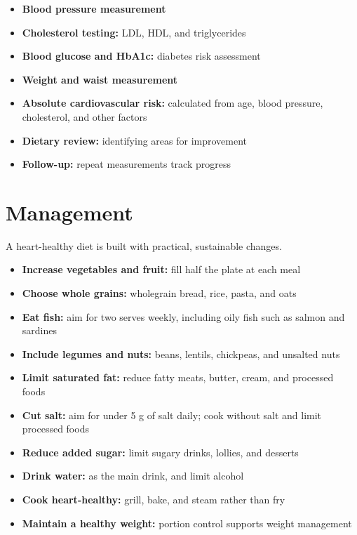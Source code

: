 \begin{itemize}
    \item \textbf{Blood pressure measurement}
    \item \textbf{Cholesterol testing:} LDL, HDL, and triglycerides
    \item \textbf{Blood glucose and HbA1c:} diabetes risk assessment
    \item \textbf{Weight and waist measurement}
    \item \textbf{Absolute cardiovascular risk:} calculated from age, blood pressure, cholesterol, and other factors
    \item \textbf{Dietary review:} identifying areas for improvement
    \item \textbf{Follow-up:} repeat measurements track progress
\end{itemize}

\section*{Management}
A heart-healthy diet is built with practical, sustainable changes.

\begin{itemize}
    \item \textbf{Increase vegetables and fruit:} fill half the plate at each meal
    \item \textbf{Choose whole grains:} wholegrain bread, rice, pasta, and oats
    \item \textbf{Eat fish:} aim for two serves weekly, including oily fish such as salmon and sardines
    \item \textbf{Include legumes and nuts:} beans, lentils, chickpeas, and unsalted nuts
    \item \textbf{Limit saturated fat:} reduce fatty meats, butter, cream, and processed foods
    \item \textbf{Cut salt:} aim for under 5 g of salt daily; cook without salt and limit processed foods
    \item \textbf{Reduce added sugar:} limit sugary drinks, lollies, and desserts
    \item \textbf{Drink water:} as the main drink, and limit alcohol
    \item \textbf{Cook heart-healthy:} grill, bake, and steam rather than fry
    \item \textbf{Maintain a healthy weight:} portion control supports weight management
\end{itemize}

